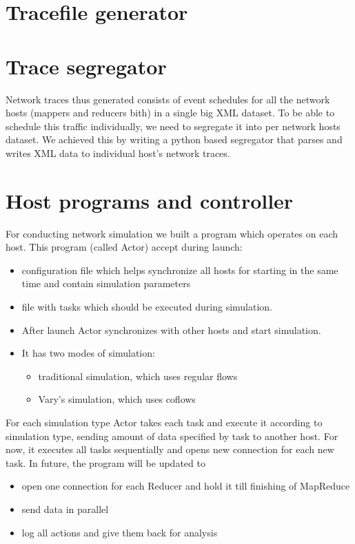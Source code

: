\documentclass{article}
\begin{document}
\section{Tracefile generator}


\section{Trace segregator}
Network traces thus generated consists of event schedules for all the network hosts (mappers and reducers bith) in a single big XML dataset. To be able to schedule this traffic individually, we need to segregate it into per network hosts dataset. We achieved this by writing a python based segregator that parses and writes XML data to individual host's network traces.

\section{Host programs and controller}
For conducting network simulation we built a program which  operates on each host. This program (called Actor) accept during launch:
\begin{itemize}
\item configuration file which helps synchronize all hosts for starting in the same time and contain simulation parameters
\item file with tasks which should be executed during simulation.
\item After launch Actor synchronizes with other hosts and start simulation.
\item It has two modes of simulation:

\begin{itemize}
\item traditional simulation, which uses regular flows
\item Vary's simulation, which uses coflows
\end{itemize}
\end{itemize}

For each simulation type Actor takes each task and execute it according to simulation type, sending amount of data specified by task to another host.
For now, it executes all tasks sequentially and opens new connection for each new task. In future, the program will be updated to 

\begin{itemize}
\item open one connection for each Reducer and hold it till finishing of MapReduce
\item send data in parallel
\item log all actions and give them back for analysis
\end{itemize}
\end{document}
